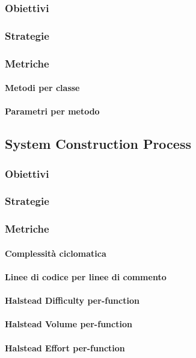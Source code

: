 		\subsubsection{Obiettivi}
		\subsubsection{Strategie}
		\subsubsection{Metriche}
			\paragraph{Metodi per classe}
			\paragraph{Parametri per metodo}

	\subsection{System Construction Process}
		\subsubsection{Obiettivi}
		\subsubsection{Strategie}
		\subsubsection{Metriche}
			\paragraph{Complessità ciclomatica}
			\paragraph{Linee di codice per linee di commento}
			\paragraph{Halstead Difficulty per-function}
			\paragraph{Halstead Volume per-function}
			\paragraph{Halstead Effort per-function}
